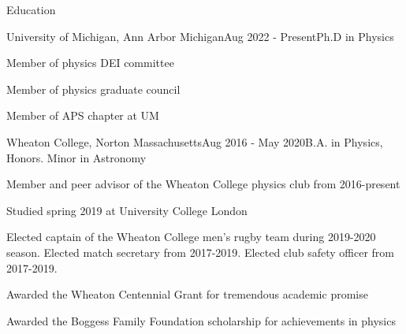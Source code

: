 \documentclass{resume} %
\begin{document}
\begin{rSection}{Education}
    \begin{rSubsection}
        {University of Michigan, Ann Arbor Michigan}{Aug 2022 - Present}{Ph.D in Physics}{}
        \item Member of physics DEI committee
\item Member of physics graduate council
\item Member of APS chapter at UM
    \end{rSubsection}

\begin{itemize}\itemsep -6pt

\end{itemize}
\begin{rSubsection}
    {Wheaton College, Norton Massachusetts}{Aug 2016 - May 2020}{B.A. in Physics, Honors. Minor in Astronomy}{}
    \item Member and peer advisor of the Wheaton College physics club from 2016-present
    \item Studied spring 2019 at University College London
    \item Elected captain of the Wheaton College men's rugby team during 2019-2020 season. Elected match secretary from 2017-2019. Elected club safety officer from 2017-2019.
        \item Awarded the Wheaton Centennial Grant for tremendous academic promise
        \item Awarded the Boggess Family Foundation scholarship for achievements in physics

        
\end{rSubsection}


\end{rSection}
\end{document}
